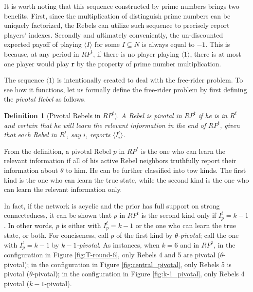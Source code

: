 \documentclass[12pt,letter]{article}
\newtheorem{definition}{Definition}[section]
\theoremstyle{definition}
\theoremstyle{remark}
\theoremstyle{claim}
\begin{document}
It is worth noting that this sequence constructed by prime numbers brings two benefits. First, since the multiplication of distinguish prime numbers can be uniquely factorized, the Rebels can utilize such sequence to precisely report players' indexes. Secondly and ultimately conveniently, the un-discounted expected payoff of playing $\langle I \rangle$ for some $I\subseteq N$ is always equal to $-1$. This is because, at any period in $RP^{t}$, if there is no player playing $\langle 1 \rangle$, there is at most one player would play \textbf{r} by the property of prime number multiplication. 

The sequence $\langle 1 \rangle$ is intentionally created to deal with the free-rider problem. To see how it functions, let us formally define the free-rider problem by first defining the \textit{pivotal Rebel} as follows.
\begin{definition}[Pivotal Rebels in $RP^t$]
A Rebel is pivotal in $RP^t$ if he is in $R^t$ and certain that he will learn the relevant information in the end of $RP^t$, given that each Rebel in $R^t$, say $i$, reports $\langle I^t_i \rangle$.
\end{definition}

From the definition, a pivotal Rebel $p$ in $RP^t$ is the one who can learn the relevant information if all of his active Rebel neighbors truthfully report their information about $\theta$ to him. He can be further classified into tow kinds. The first kind is the one who can learn the true state, while the second kind is the one who can learn the relevant information only. 

In fact, if the network is acyclic and the prior has full support on strong connectedness, it can be shown that $p$ in $RP^{t}$ is the second kind only if $I^{t}_p=k-1$. In other words, $p$ is either with $I^{t}_p=k-1$ or the one who can learn the true state, or both. For conciseness, call $p$ of the first kind by \textit{$\theta$-pivotal}; call the one with $I^t_p=k-1$ by \textit{$k-1$-pivotal}. As instances, when $k=6$ and in $RP^1$, in the configuration in Figure \ref{fig:T-round-6}, only Rebels 4 and 5 are pivotal ($\theta$-pivotal); in the configuration in Figure \ref{fig:central_pivotal}, only Rebels 5 is pivotal ($\theta$-pivotal); in the configuration in Figure \ref{fig:k-1_pivotal}, only Rebels 4 pivotal ($k-1$-pivotal).
\end{document}
